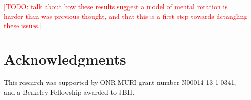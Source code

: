 \documentclass[10pt,letterpaper]{article}
\newcommand{\TODO}[1]{\textcolor{red}{[TODO: #1]}}
\begin{document}
\TODO{talk about how these results suggest a model of mental rotation
  is harder than was previous thought, and that this is a first step
  towards detangling these issues.}

\section{Acknowledgments}

This research was supported by ONR MURI grant number N00014-13-1-0341,
and a Berkeley Fellowship awarded to JBH.



\setlength{\bibleftmargin}{.125in}
\setlength{\bibindent}{-\bibleftmargin}


\end{document}
